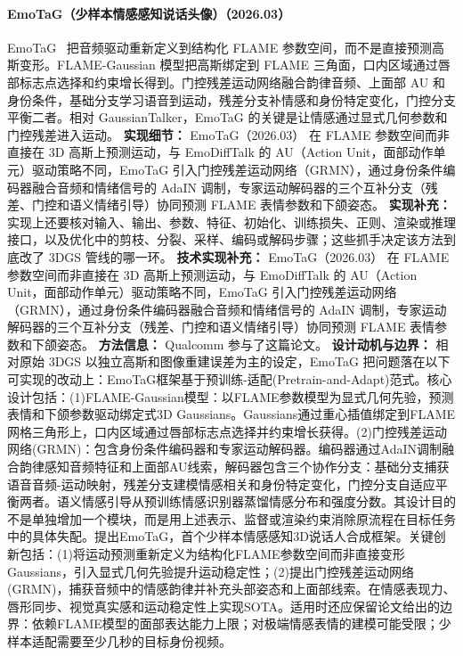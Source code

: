 \paragraph{EmoTaG（少样本情感感知说话头像）（2026.03）}
EmoTaG~\cite{2603_21332} 把音频驱动重新定义到结构化 FLAME 参数空间，而不是直接预测高斯变形。FLAME-Gaussian 模型把高斯绑定到 FLAME 三角面，口内区域通过唇部标志点选择和约束增长得到。门控残差运动网络融合韵律音频、上面部 AU 和身份条件，基础分支学习语音到运动，残差分支补情感和身份特定变化，门控分支平衡二者。相对 GaussianTalker，EmoTaG 的关键是让情感通过显式几何参数和门控残差进入运动。
\textbf{实现细节：} EmoTaG（2026.03） 在 FLAME 参数空间而非直接在 3D 高斯上预测运动，与 EmoDiffTalk 的 AU（Action Unit，面部动作单元）驱动策略不同，EmoTaG 引入门控残差运动网络（GRMN），通过身份条件编码器融合音频和情绪信号的 AdaIN 调制，专家运动解码器的三个互补分支（残差、门控和语义情绪引导）协同预测 FLAME 表情参数和下颌姿态。
\textbf{实现补充：} 实现上还要核对输入、输出、参数、特征、初始化、训练损失、正则、渲染或推理接口，以及优化中的剪枝、分裂、采样、编码或解码步骤；这些抓手决定该方法到底改了 3DGS 管线的哪一环。
\textbf{技术实现补充：} EmoTaG（2026.03） 在 FLAME 参数空间而非直接在 3D 高斯上预测运动，与 EmoDiffTalk 的 AU（Action Unit，面部动作单元）驱动策略不同，EmoTaG 引入门控残差运动网络（GRMN），通过身份条件编码器融合音频和情绪信号的 AdaIN 调制，专家运动解码器的三个互补分支（残差、门控和语义情绪引导）协同预测 FLAME 表情参数和下颌姿态。
\textbf{方法信息：} Qualcomm 参与了这篇论文。
\textbf{设计动机与边界：} 相对原始 3DGS 以独立高斯和图像重建误差为主的设定，EmoTaG 把问题落在以下可实现的改动上：EmoTaG框架基于预训练-适配(Pretrain-and-Adapt)范式。核心设计包括：(1)FLAME-Gaussian模型：以FLAME参数模型为显式几何先验，预测表情和下颌参数驱动绑定式3D Gaussians。Gaussians通过重心插值绑定到FLAME网格三角形上，口内区域通过唇部标志点选择并约束增长获得。(2)门控残差运动网络(GRMN)：包含身份条件编码器和专家运动解码器。编码器通过AdaIN调制融合韵律感知音频特征和上面部AU线索，解码器包含三个协作分支：基础分支捕获语音音频-运动映射，残差分支建模情感相关和身份特定变化，门控分支自适应平衡两者。语义情感引导从预训练情感识别器蒸馏情感分布和强度分数。其设计目的不是单独增加一个模块，而是用上述表示、监督或渲染约束消除原流程在目标任务中的具体失配。提出EmoTaG，首个少样本情感感知3D说话人合成框架。关键创新包括：(1)将运动预测重新定义为结构化FLAME参数空间而非直接变形Gaussians，引入显式几何先验提升运动稳定性；(2)提出门控残差运动网络(GRMN)，捕获音频中的情感韵律并补充头部姿态和上面部线索。在情感表现力、唇形同步、视觉真实感和运动稳定性上实现SOTA。适用时还应保留论文给出的边界：依赖FLAME模型的面部表达能力上限；对极端情感表情的建模可能受限；少样本适配需要至少几秒的目标身份视频。

